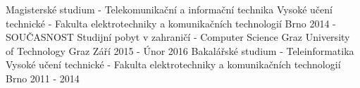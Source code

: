 

\begin{cventries}

  \cventry
    {Magisterské studium - Telekomunikační a informační technika}
    {Vysoké učení technické - Fakulta elektrotechniky a komunikačních technologií}
    {Brno}
    {2014 - SOUČASNOST}
    {}
  \cventry
    {Studijní pobyt v zahraničí - Computer Science}
    {Graz University of Technology}
    {Graz}
    {Září 2015 - Únor 2016}
    {}
  \cventry
    {Bakalářské studium - Teleinformatika} %
    {Vysoké učení technické - Fakulta elektrotechniky a komunikačních technologií} %
    {Brno} %
    {2011 - 2014} %
    {}
    
    

\end{cventries}